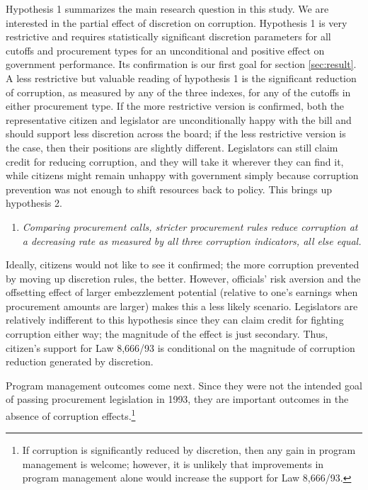 \documentclass[11pt]{article}
\newcommand{\hypopen}{Comparing procurement calls}
\begin{document}
Hypothesis 1 summarizes the main research question in this study. We are interested in the partial effect of discretion on corruption. Hypothesis 1 is very restrictive and requires statistically significant discretion parameters for all cutoffs and procurement types for an unconditional and positive effect on government performance. Its confirmation is our first goal for section \ref{sec:result}. A less restrictive but valuable reading of hypothesis 1 is the significant reduction of corruption, as measured by any of the three indexes, for any of the cutoffs in either procurement type. If the more restrictive version is confirmed, both the representative citizen and legislator are unconditionally happy with the bill and should support less discretion across the board; if the less restrictive version is the case, then their positions are slightly different. Legislators can still claim credit for reducing corruption, and they will take it wherever they can find it, while citizens might remain unhappy with government simply because corruption prevention was not enough to shift resources back to policy. This brings up hypothesis 2.

\begin{enumerate}[label = H\arabic{enumi}:, font = \bfseries, labelindent = \parindent, leftmargin = *, resume] %
  \item \textit{\hypopen, stricter procurement rules reduce corruption at a decreasing rate as measured by all three corruption indicators, \emph{all else equal}.}
\end{enumerate}

Ideally, citizens would not like to see it confirmed; the more corruption prevented by moving up discretion rules, the better. However, officials' risk aversion and the offsetting effect of larger embezzlement potential (relative to one's earnings when procurement amounts are larger) makes this a less likely scenario. Legislators are relatively indifferent to this hypothesis since they can claim credit for fighting corruption either way; the magnitude of the effect is just secondary. Thus, citizen's support for Law 8,666/93 is conditional on the magnitude of corruption reduction generated by discretion.

Program management outcomes come next. Since they were not the intended goal of passing procurement legislation in 1993, they are important outcomes in the absence of corruption effects.\footnote{If corruption is significantly reduced by discretion, then any gain in program management is welcome; however, it is unlikely that improvements in program management alone would increase the support for Law 8,666/93.}
\end{document}
